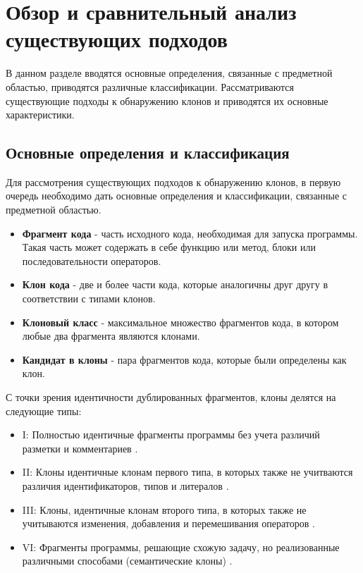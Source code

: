 \chapter{Обзор и сравнительный анализ существующих подходов}
В данном разделе вводятся основные определения, связанные с предметной областью, приводятся различные классификации. Рассматриваются существующие подходы к обнаружению клонов и приводятся их основные характеристики.
\section{Основные определения и классификация}

Для рассмотрения существующих подходов к обнаружению клонов, в первую очередь необходимо дать основные определения и классификации, связанные с предметной областью. 

\begin{itemize}
\setlength\itemsep{0mm}
\item \textbf{Фрагмент кода} - часть исходного кода, необходимая для запуска программы. Такая часть может содержать в себе функцию или метод, блоки или последовательности операторов.
\item \textbf{Клон кода} - две и более части кода, которые аналогичны друг другу в соответствии с типами клонов.
\item \textbf{Клоновый класс} - максимальное множество фрагментов кода, в котором любые два фрагмента являются клонами.
\item \textbf{Кандидат в клоны} - пара фрагментов кода, которые были определены как клон.
\end{itemize}

С точки зрения идентичности дублированных фрагментов, клоны делятся на следующие типы:
\begin{itemize}
\setlength\itemsep{0mm}
\item I: Полностью идентичные фрагменты программы без учета различий разметки и комментариев \cite{surveyroyandcordy} \cite{akhinitsykson}.
\item II: Клоны идентичные клонам первого типа, в которых также не учитваются различия идентификаторов, типов и литералов \cite{surveyroyandcordy} \cite{akhinitsykson}.
\item III: Клоны, идентичные клонам второго типа, в которых также не учитываются изменения, добавления и перемешивания операторов \cite{surveyroyandcordy} \cite{akhinitsykson}.
\item VI: Фрагменты программы, решающие схожую задачу, но реализованные различными способами (семантические клоны) \cite{surveyroyandcordy} \cite{akhinitsykson}.
\end{itemize}

